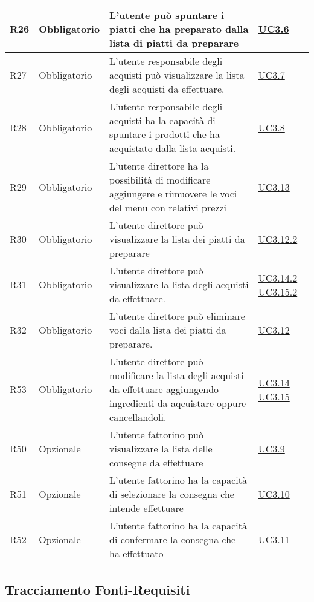 \begin{longtable}{|P{1.5cm}|P{3cm}|P{6cm}|P{2.5cm}|}
	\hline R26 & Obbligatorio & L’utente  può spuntare i piatti che ha preparato dalla lista di piatti da preparare  & \hyperref[UC3.6]{UC3.6} \\
	\hline R27 & Obbligatorio & L’utente responsabile degli acquisti può visualizzare la lista degli acquisti da effettuare. & \hyperref[UC3.7]{UC3.7} \\
	\hline R28 & Obbligatorio & L’utente responsabile degli acquisti ha la capacità di spuntare i prodotti che ha acquistato dalla lista acquisti.
	 & \hyperref[UC3.8]{UC3.8} \\
	\hline R29 & Obbligatorio & L’utente direttore ha la possibilità di modificare aggiungere e rimuovere le voci del menu con relativi prezzi & \hyperref[UC3.13]{UC3.13} \\
	\hline R30 & Obbligatorio & L’utente direttore può visualizzare la lista dei piatti da preparare & \hyperref[UC3.12.2]{UC3.12.2} \\
	\hline R31 & Obbligatorio & L’utente direttore può visualizzare la lista degli acquisti da effettuare. & \hyperref[UC3.14.2]{UC3.14.2} \hyperref[UC3.15.2]{UC3.15.2} \\
	\hline R32 & Obbligatorio & L’utente direttore può eliminare voci dalla lista dei piatti da preparare. & \hyperref[UC3.12]{UC3.12} \\
	\hline R53 & Obbligatorio & L’utente direttore può modificare la lista degli acquisti da effettuare aggiungendo ingredienti da aqcuistare oppure cancellandoli.
	 & \hyperref[UC3.14]{UC3.14} \linebreak \hyperref[UC3.15]{UC3.15} \\	 
	\hline R50 & Opzionale & L’utente fattorino può visualizzare la lista delle consegne da effettuare & \hyperref[UC3.9]{UC3.9} \\
	\hline R51 & Opzionale & L’utente fattorino ha la capacità di selezionare la consegna che intende effettuare & \hyperref[UC3.10]{UC3.10} \\
	\hline R52 & Opzionale & L’utente fattorino ha la capacità di confermare la consegna che ha effettuato & \hyperref[UC3.11]{UC3.11} \\
	\hline
\end{longtable}

\subsection{Tracciamento Fonti-Requisiti}


